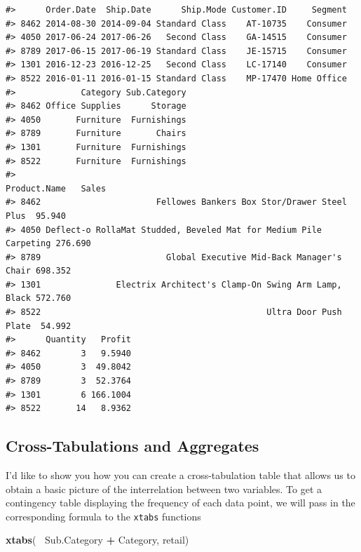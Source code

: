 \documentclass[]{article}
\newenvironment{Shaded}{\begin{snugshade}}{\end{snugshade}}
\newcommand{\KeywordTok}[1]{\textcolor[rgb]{0.13,0.29,0.53}{\textbf{#1}}}
\newcommand{\NormalTok}[1]{#1}
\newcommand{\OperatorTok}[1]{\textcolor[rgb]{0.81,0.36,0.00}{\textbf{#1}}}
\newcommand{\StringTok}[1]{\textcolor[rgb]{0.31,0.60,0.02}{#1}}
\begin{document}
\begin{verbatim}
#>      Order.Date  Ship.Date      Ship.Mode Customer.ID     Segment
#> 8462 2014-08-30 2014-09-04 Standard Class    AT-10735    Consumer
#> 4050 2017-06-24 2017-06-26   Second Class    GA-14515    Consumer
#> 8789 2017-06-15 2017-06-19 Standard Class    JE-15715    Consumer
#> 1301 2016-12-23 2016-12-25   Second Class    LC-17140    Consumer
#> 8522 2016-01-11 2016-01-15 Standard Class    MP-17470 Home Office
#>             Category Sub.Category
#> 8462 Office Supplies      Storage
#> 4050       Furniture  Furnishings
#> 8789       Furniture       Chairs
#> 1301       Furniture  Furnishings
#> 8522       Furniture  Furnishings
#>                                                           Product.Name   Sales
#> 8462                       Fellowes Bankers Box Stor/Drawer Steel Plus  95.940
#> 4050 Deflect-o RollaMat Studded, Beveled Mat for Medium Pile Carpeting 276.690
#> 8789                         Global Executive Mid-Back Manager's Chair 698.352
#> 1301               Electrix Architect's Clamp-On Swing Arm Lamp, Black 572.760
#> 8522                                             Ultra Door Push Plate  54.992
#>      Quantity   Profit
#> 8462        3   9.5940
#> 4050        3  49.8042
#> 8789        3  52.3764
#> 1301        6 166.1004
#> 8522       14   8.9362
\end{verbatim}

\hypertarget{cross-tabulations-and-aggregates}{%
\subsection{Cross-Tabulations and
Aggregates}\label{cross-tabulations-and-aggregates}}

I'd like to show you how you can create a cross-tabulation table that
allows us to obtain a basic picture of the interrelation between two
variables. To get a contingency table displaying the frequency of each
data point, we will pass in the corresponding formula to the
\texttt{xtabs} functions

\begin{Shaded}
\begin{Highlighting}[]
\KeywordTok{xtabs}\NormalTok{(}\OperatorTok{~}\StringTok{ }\NormalTok{Sub.Category }\OperatorTok{+}\StringTok{ }\NormalTok{Category, retail)}
\end{Highlighting}
\end{Shaded}
\end{document}

